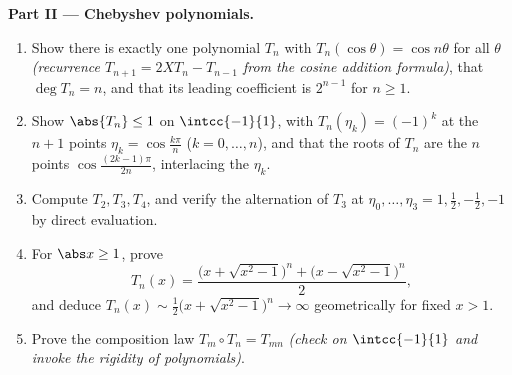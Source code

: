 \begin{problem}
\medskip
\noindent\textbf{Part II --- Chebyshev polynomials.}
\begin{enumerate}[resume]
  \item Show there is exactly one polynomial $T_n$ with
        $T_n(\cos\theta) = \cos n\theta$ for all $\theta$
        \emph{(recurrence $T_{n+1} = 2XT_n - T_{n-1}$ from the
        cosine addition formula)}, that $\deg T_n = n$, and that
        its leading coefficient is $2^{n-1}$ for $n \geq 1$.
  \item Show $\abs{T_n} \leq 1$ on $\intcc{-1}{1}$, with
        $T_n(\eta_k) = (-1)^k$ at the $n + 1$ points $\eta_k =
        \cos\frac{k\pi}{n}$ ($k = 0, \dots, n$), and that the
        roots of $T_n$ are the $n$ points
        $\cos\frac{(2k-1)\pi}{2n}$, interlacing the $\eta_k$.
  \item Compute $T_2, T_3, T_4$, and verify the alternation of
        $T_3$ at $\eta_0, \dots, \eta_3 = 1, \frac12, -\frac12,
        -1$ by direct evaluation.
  \item For $\abs x \geq 1$, prove
        \[
        T_n(x) = \frac{\bigl(x + \sqrt{x^2 - 1}\bigr)^n +
        \bigl(x - \sqrt{x^2 - 1}\bigr)^n}{2},
        \]
        and deduce $T_n(x) \sim \frac12\bigl(x + \sqrt{x^2 -
        1}\bigr)^n \to \infty$ geometrically for fixed $x > 1$.
  \item Prove the composition law $T_m \circ T_n = T_{mn}$
        \emph{(check on $\intcc{-1}{1}$ and invoke the rigidity
        of polynomials)}.
\end{enumerate}


\end{problem}
